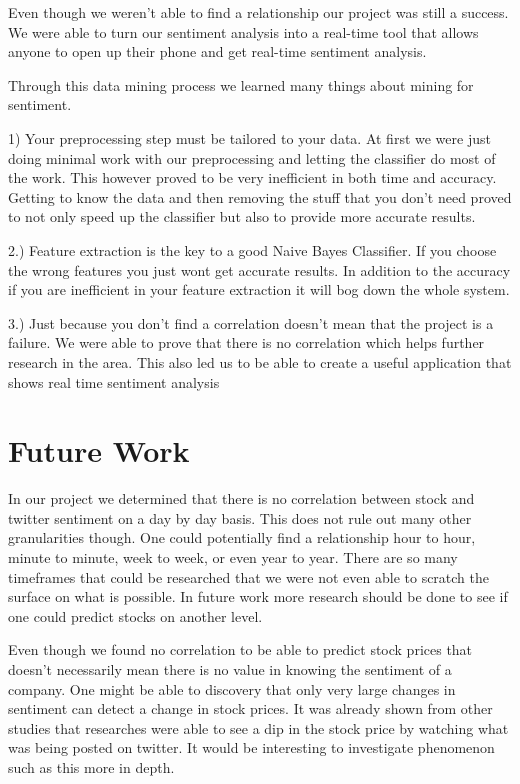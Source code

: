 \documentclass{acm_proc_article-sp}
\begin{document}
Even though we weren't able to find a relationship our project was still a success.
We were able to turn our sentiment analysis into a real-time tool that allows anyone
to open up their phone and get real-time sentiment analysis. 

Through this data mining process we learned many things about mining for sentiment.

1) Your preprocessing step must be tailored to your data. At first we were just doing
minimal work with our preprocessing and letting the classifier do most of the work. 
This however proved to be very inefficient in both time and accuracy. Getting to know
the data and then removing the stuff that you don't need proved to not only speed 
up the classifier but also to provide more accurate results.

2.) Feature extraction is the key to a good Naive Bayes Classifier. If you choose
the wrong features you just wont get accurate results. In addition to the accuracy
if you are inefficient in your feature extraction it will bog down the whole system. 

3.) Just because you don't find a correlation doesn't mean that the project is a failure.
We were able to prove that there is no correlation which helps further research in 
the area. This also led us to be able to create a useful application that shows real time 
sentiment analysis

\section{Future Work}

In our project we determined that there is no correlation between stock and
twitter sentiment on a day by day basis. This does not rule out many other
granularities though.  One could potentially find a relationship hour to hour,
minute to minute, week to week, or even year to year. There are so many
timeframes that could be researched that we were not even able to scratch the
surface on what is possible. In future work more research should be done to see
if one could predict stocks on another level. 

Even though we found no correlation to be able to predict stock prices that
doesn't necessarily mean there is no value in knowing the sentiment of a
company. One might be able to discovery that only very large changes in
sentiment can detect a change in stock prices.  It was already shown from other
studies that researches were able to see a dip in the stock price by watching
what was being posted on twitter. It would be interesting to investigate
phenomenon such as this more in depth.  

\printbibliography

 
\end{document}
